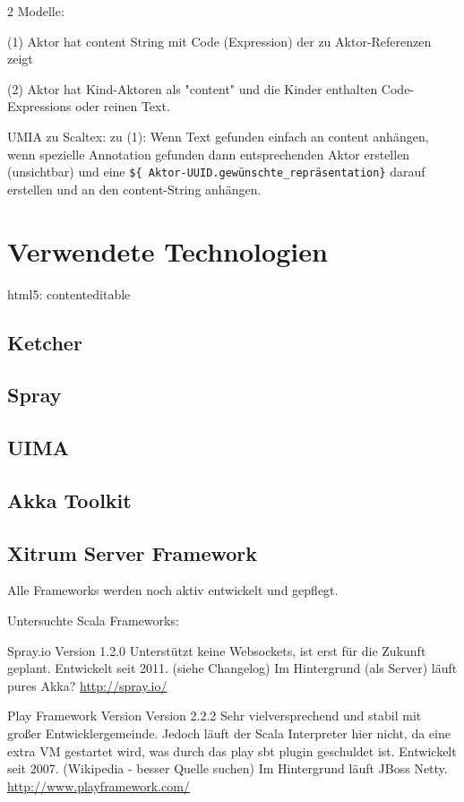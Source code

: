 2 Modelle:

(1) Aktor hat content String mit Code (Expression) der zu Aktor-Referenzen zeigt

(2) Aktor hat Kind-Aktoren als "content" und die Kinder enthalten Code-Expressions
    oder reinen Text.

UMIA zu Scaltex:
zu (1): Wenn Text gefunden einfach an content anhängen, wenn spezielle
Annotation gefunden dann entsprechenden Aktor erstellen (unsichtbar) und
eine \verb|${ Aktor-UUID.gewünschte_repräsentation}| darauf erstellen und an
den content-String anhängen.


\section{Verwendete Technologien}

html5: contenteditable

\subsection{Ketcher}

\subsection{Spray}

\subsection{UIMA}

\subsection{Akka Toolkit}

\subsection{Xitrum Server Framework}

Alle Frameworks werden noch aktiv entwickelt und gepflegt.

Untersuchte Scala Frameworks:

Spray.io Version 1.2.0
Unterstützt keine Websockets, ist erst für die Zukunft geplant.
Entwickelt seit 2011. (siehe Changelog)
Im Hintergrund (als Server) läuft pures Akka?
\url{http://spray.io/}

Play Framework Version Version 2.2.2
Sehr vielversprechend und stabil mit großer Entwicklergemeinde.
Jedoch läuft der Scala Interpreter hier nicht, da eine extra VM gestartet
wird, was durch das play sbt plugin geschuldet ist.
Entwickelt seit 2007. (Wikipedia - besser Quelle suchen)
Im Hintergrund läuft JBoss Netty.
\url{http://www.playframework.com/}

